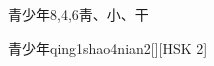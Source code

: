 \begin{entry}{青少年}{8,4,6}{⾭、⼩、⼲}
  \begin{phonetics}{青少年}{qing1shao4nian2}[][HSK 2]
  \end{phonetics}
\end{entry}

